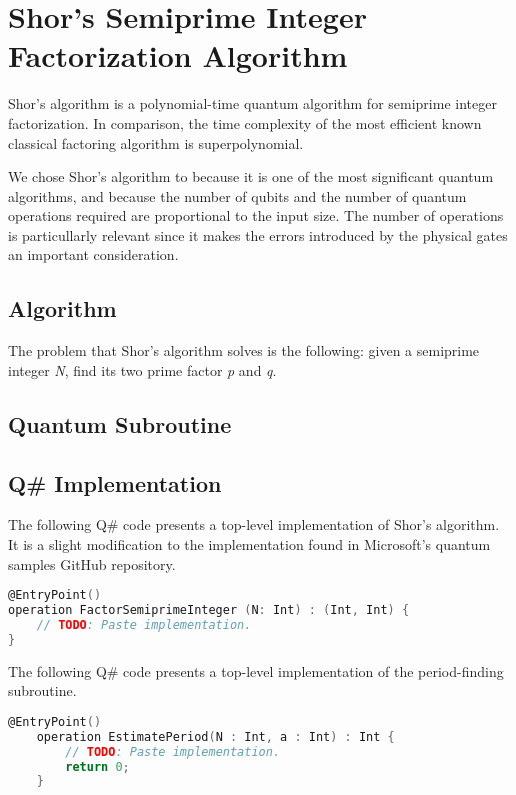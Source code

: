 %
%
\chapter {Shor's Semiprime Integer Factorization Algorithm}

Shor's algorithm is a polynomial-time quantum algorithm for semiprime integer factorization. In comparison, the time complexity of the most efficient known classical factoring algorithm is superpolynomial.

We chose Shor's algorithm to because it is one of the most significant quantum algorithms, and because the number of qubits and the number of quantum operations required are proportional to the input size. The number of operations is particullarly relevant since it makes the errors introduced by the physical gates an important consideration.

\section{Algorithm}

The problem that Shor's algorithm solves is the following: given a semiprime integer \textit{N}, find its two prime factor \textit{p} and \textit{q}.


\section{Quantum Subroutine}


\section{Q\# Implementation}

The following Q\# code presents a top-level implementation of Shor's algorithm. It is a slight modification to the implementation found in Microsoft's quantum samples GitHub repository.



\begin{lstlisting}[language=C]
@EntryPoint()
operation FactorSemiprimeInteger (N: Int) : (Int, Int) {
    // TODO: Paste implementation.
}
\end{lstlisting}

The following Q\# code presents a top-level implementation of the period-finding subroutine.

\begin{lstlisting}[language=C]
    @EntryPoint()
    operation EstimatePeriod(N : Int, a : Int) : Int {
        // TODO: Paste implementation.
        return 0;
    }
\end{lstlisting}
